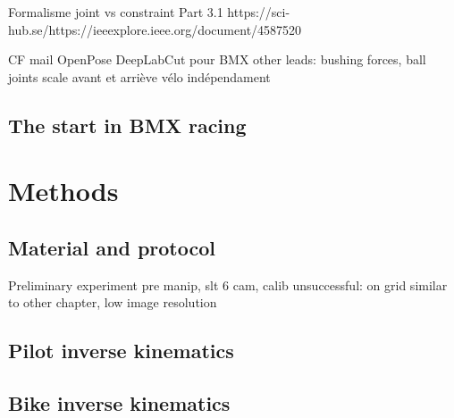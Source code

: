 Formalisme joint vs constraint Part 3.1 https://sci-hub.se/https://ieeexplore.ieee.org/document/4587520

CF mail OpenPose DeepLabCut pour BMX
other leads: bushing forces, ball joints
scale avant et arriève vélo indépendament




\subsection{The start in BMX racing}



\section{Methods}

\subsection{Material and protocol}

Preliminary experiment
pre manip, slt 6 cam, calib unsuccessful: on grid similar to other chapter, low image resolution

\subsection{Pilot inverse kinematics}


\subsection{Bike inverse kinematics}

